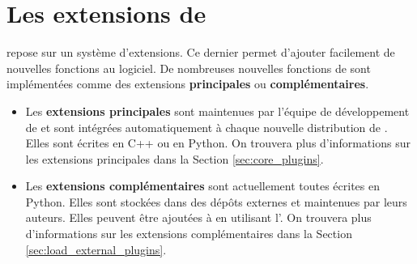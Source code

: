 
\chapter{Les extensions de \qg}\label{sec:plugins}



\qg repose sur un système d'extensions. Ce dernier permet d'ajouter facilement 
de nouvelles fonctions au logiciel. De nombreuses nouvelles fonctions de \qg 
sont implémentées comme des extensions \textbf{principales} ou \textbf{complémentaires}. 

\begin{itemize}[label=--]
\item Les \textbf{extensions principales} sont maintenues par l'équipe de 
développement de \qg et sont intégrées automatiquement à chaque nouvelle 
distribution de \qg. Elles sont écrites en C++ ou en Python. On trouvera plus 
d'informations sur les extensions principales dans la Section \ref{sec:core_plugins}.
\item Les \textbf{extensions complémentaires} sont actuellement toutes écrites en 
Python. Elles sont stockées dans des dépôts externes et maintenues par leurs auteurs. 
Elles peuvent être ajoutées à \qg en utilisant l'. 
On trouvera plus d'informations sur les extensions complémentaires dans la Section 
\ref{sec:load_external_plugins}.
\end{itemize}

